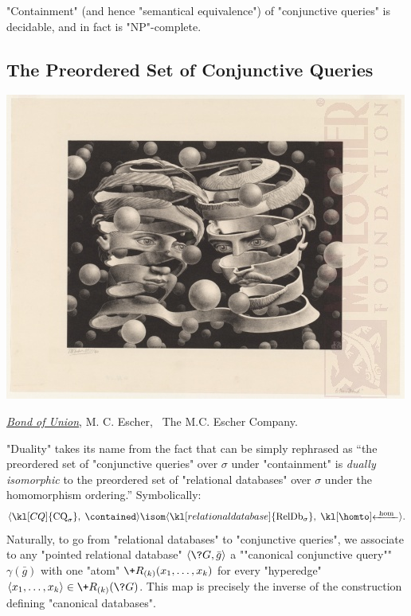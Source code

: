 \begin{corollary}
	\label{coro:prelim-db-containment-cq}
	"Containment" (and hence "semantical equivalence") of "conjunctive queries" is
	decidable, and in fact is "NP"-complete.
\end{corollary}


\subsection{The Preordered Set of Conjunctive Queries}
\label{sec:prelim-db-poset-cq}

\begin{marginfigure}
	\centering
	\includegraphics[width=\linewidth]{fig/escher/bound-of-union.jpg}
	\caption{\href{https://mcescher.com/gallery/most-popular/\#iLightbox[gallery\_image\_1]/23}{\emph{Bond of Union}}, M. C. Escher, \textcopyright~The M.C. Escher Company.}
\end{marginfigure}
"Duality" takes its name from the fact that  can be simply rephrased as
``the preordered set of "conjunctive queries" over $\sigma$ under
"containment" is \emph{dually isomorphic} to the preordered set of "relational databases"
over $\sigma$ under the homomorphism ordering.'' Symbolically: 
\[
	\tup{\kl[CQ]{\textrm{CQ}_\sigma},\; \contained }
	\isom
	\tup{\kl[relational database]{\textrm{RelDb}_\sigma},\; \cohomto }.
\]
Naturally, to go from "relational databases" to "conjunctive queries",
we associate to any "pointed relational database" $\tup{\?G, \bar g}$
a ""canonical conjunctive query"" $\gamma(\bar g)$ with one "atom"
$\+R_{(k)}(x_1,\hdots,x_k)$ for every "hyperedge" $\tup{x_1,\hdots,x_k} \in \+R_{(k)}(\?G)$.
This map is precisely the inverse of the construction defining "canonical databases".


